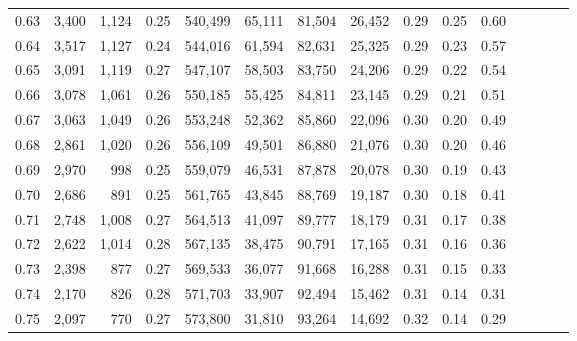 \begin{tabular}{rrrcrrrrrrrrrrr}
0.63 &   3,400 &  1,124 &                                       0.25 &  540,499 &   65,111 &   81,504 &   26,452 &  0.29 &  0.25 &                         0.60 \\
0.64 &   3,517 &  1,127 &                                       0.24 &  544,016 &   61,594 &   82,631 &   25,325 &  0.29 &  0.23 &                         0.57 \\
0.65 &   3,091 &  1,119 &                                       0.27 &  547,107 &   58,503 &   83,750 &   24,206 &  0.29 &  0.22 &                         0.54 \\
0.66 &   3,078 &  1,061 &                                       0.26 &  550,185 &   55,425 &   84,811 &   23,145 &  0.29 &  0.21 &                         0.51 \\
0.67 &   3,063 &  1,049 &                                       0.26 &  553,248 &   52,362 &   85,860 &   22,096 &  0.30 &  0.20 &                         0.49 \\
0.68 &   2,861 &  1,020 &                                       0.26 &  556,109 &   49,501 &   86,880 &   21,076 &  0.30 &  0.20 &                         0.46 \\
0.69 &   2,970 &    998 &                                       0.25 &  559,079 &   46,531 &   87,878 &   20,078 &  0.30 &  0.19 &                         0.43 \\
0.70 &   2,686 &    891 &                                       0.25 &  561,765 &   43,845 &   88,769 &   19,187 &  0.30 &  0.18 &                         0.41 \\
0.71 &   2,748 &  1,008 &                                       0.27 &  564,513 &   41,097 &   89,777 &   18,179 &  0.31 &  0.17 &                         0.38 \\
0.72 &   2,622 &  1,014 &                                       0.28 &  567,135 &   38,475 &   90,791 &   17,165 &  0.31 &  0.16 &                         0.36 \\
0.73 &   2,398 &    877 &                                       0.27 &  569,533 &   36,077 &   91,668 &   16,288 &  0.31 &  0.15 &                         0.33 \\
0.74 &   2,170 &    826 &                                       0.28 &  571,703 &   33,907 &   92,494 &   15,462 &  0.31 &  0.14 &                         0.31 \\
0.75 &   2,097 &    770 &                                       0.27 &  573,800 &   31,810 &   93,264 &   14,692 &  0.32 &  0.14 &                         0.29 \\

\end{tabular}
